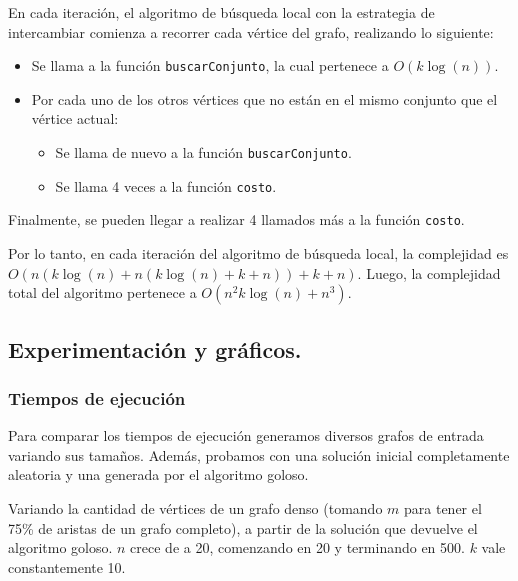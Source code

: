 En cada iteración, el algoritmo de búsqueda local con la estrategia de
intercambiar comienza a recorrer cada vértice del grafo, realizando lo siguiente:

\begin{itemize}
  \item Se llama a la función \texttt{buscarConjunto}, la cual pertenece a
  $O(k\log(n))$.

  \item Por cada uno de los otros vértices que no están en el mismo conjunto
  que el vértice actual:

  \begin{itemize}
    \item Se llama de nuevo a la función \texttt{buscarConjunto}.

    \item Se llama 4 veces a la función \texttt{costo}.
  \end{itemize}
\end{itemize}

Finalmente, se pueden llegar a realizar 4 llamados más a la función
\texttt{costo}.

Por lo tanto, en cada iteración del algoritmo de búsqueda local, la complejidad
es $O(n (k\log(n) + n (k\log(n) + k + n)) + k + n)$. Luego, la
complejidad total del algoritmo pertenece a $O(n^2k\log(n) + n^3)$.


\newpage \subsection{Experimentación y gráficos.}

\subsubsection{Tiempos de ejecución}

Para comparar los tiempos de ejecución generamos diversos grafos de entrada
variando sus tamaños. Además, probamos con una solución inicial completamente
aleatoria y una generada por el algoritmo goloso.
\vspace*{0.5cm}

Variando la cantidad de vértices de un grafo denso (tomando $m$ para tener el
75\% de aristas de un grafo completo), a partir de la solución que devuelve el
algoritmo goloso. $n$ crece de a 20, comenzando en 20 y terminando en 500.  $k$
vale constantemente 10.

\vspace*{0.5cm}

